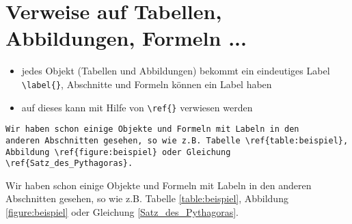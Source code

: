 \section{Verweise auf Tabellen, Abbildungen, Formeln ...}

\begin{itemize}
 \item jedes Objekt (Tabellen und Abbildungen)
       bekommt ein eindeutiges Label \lstinline$\label{}$,
       Abschnitte und Formeln können ein Label haben
 \item auf dieses kann mit Hilfe von \lstinline$\ref{}$ verwiesen werden
\end{itemize}

\begin{lstlisting}
Wir haben schon einige Objekte und Formeln mit Labeln in den
anderen Abschnitten gesehen, so wie z.B. Tabelle \ref{table:beispiel},
Abbildung \ref{figure:beispiel} oder Gleichung \ref{Satz_des_Pythagoras}.
\end{lstlisting}

Wir haben schon einige Objekte und Formeln mit Labeln in den anderen Abschnitten
gesehen, so wie z.B. Tabelle \ref{table:beispiel}, Abbildung \ref{figure:beispiel}
oder Gleichung \ref{Satz_des_Pythagoras}.
